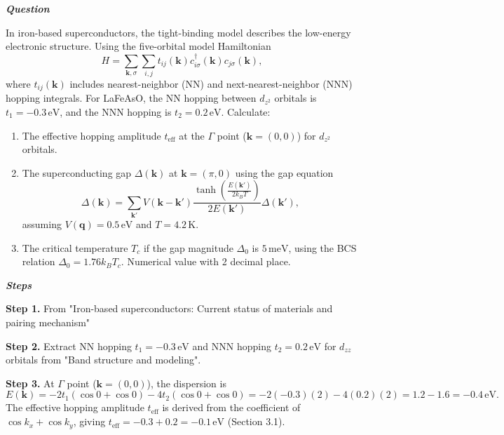 \begin{tcolorbox}[
    breakable,
    title=Example of Scientific Deep Research in Physics,
    colback=LighterGray,
    colframe=DeepPurple,
    colbacktitle=DeepPurple,
    coltitle=White,
]
\textbf{\emph{\textcolor{DeepPurple}{Question}}}

In iron-based superconductors, the tight-binding model describes the low-energy electronic structure. Using the five-orbital model Hamiltonian 
\[
H = \sum_{\mathbf{k},\sigma} \sum_{i,j} t_{ij}(\mathbf{k}) c_{i\sigma}^\dagger(\mathbf{k}) c_{j\sigma}(\mathbf{k}),
\]
where \( t_{ij}(\mathbf{k}) \) includes nearest-neighbor (NN) and next-nearest-neighbor (NNN) hopping integrals. For LaFeAsO, the NN hopping between \( d_{z^2} \) orbitals is \( t_1 = -0.3\,\text{eV} \), and the NNN hopping is \( t_2 = 0.2\,\text{eV} \). Calculate:
\begin{enumerate}
    \item The effective hopping amplitude \( t_{\text{eff}} \) at the \( \Gamma \) point (\( \mathbf{k} = (0,0) \)) for \( d_{z^2} \) orbitals.
    \item The superconducting gap \( \Delta(\mathbf{k}) \) at \( \mathbf{k} = (\pi, 0) \) using the gap equation
    \[
    \Delta(\mathbf{k}) = \sum_{\mathbf{k}'} V(\mathbf{k} - \mathbf{k}') \frac{\tanh\left( \frac{E(\mathbf{k}')}{2k_B T} \right)}{2E(\mathbf{k}')} \Delta(\mathbf{k}'),
    \]
    assuming \( V(\mathbf{q}) = 0.5\,\text{eV} \) and \( T = 4.2\,\text{K} \).
    \item The critical temperature \( T_c \) if the gap magnitude \( \Delta_0 \) is \( 5\,\text{meV} \), using the BCS relation \( \Delta_0 = 1.76 k_B T_c \). Numerical value with 2 decimal place.
\end{enumerate}

\textbf{\emph{\textcolor{DeepPurple}{Steps}}}

\textbf{\textcolor{CaseOrange}{Step 1.}} From "Iron-based superconductors: Current status of materials and pairing mechanism"

\textbf{\textcolor{CaseOrange}{Step 2.}} Extract NN hopping \( t_1 = -0.3\,\text{eV} \) and NNN hopping \( t_2 = 0.2\,\text{eV} \) for \( d_{zz} \) orbitals from "Band structure and modeling".

\textbf{\textcolor{CaseOrange}{Step 3.}} At \( \Gamma \) point (\( \mathbf{k} = (0,0) \)), the dispersion is
\[
E(\mathbf{k}) = -2t_1(\cos 0 + \cos 0) - 4t_2(\cos 0 + \cos 0) = -2(-0.3)(2) - 4(0.2)(2) = 1.2 - 1.6 = -0.4\,\text{eV}.
\]
The effective hopping amplitude \( t_{\text{eff}} \) is derived from the coefficient of \( \cos k_x + \cos k_y \), giving \( t_{\text{eff}} = -0.3 + 0.2 = -0.1\,\text{eV} \) (Section 3.1).


\end{tcolorbox}
